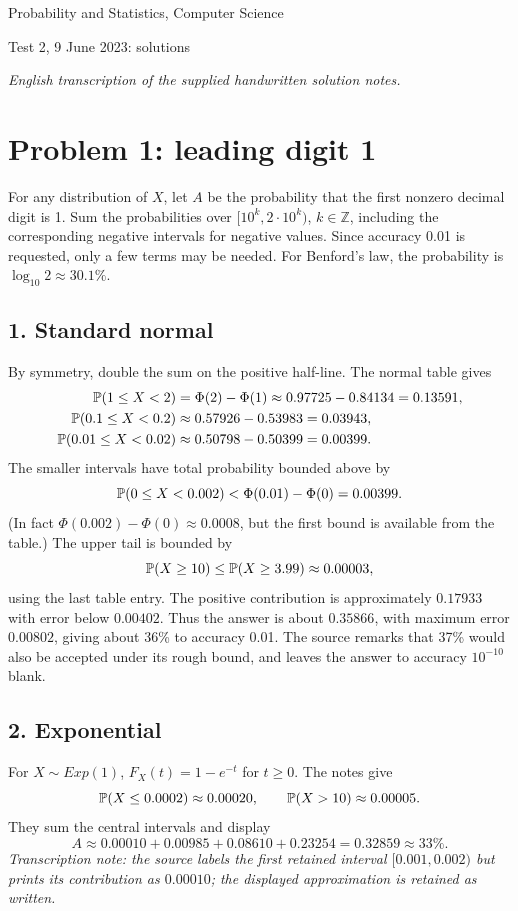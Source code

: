 \documentclass[a4paper]{article}
\begin{document}
\begin{center}\Large Probability and Statistics, Computer Science\par\large Test 2, 9 June 2023: solutions\end{center}
\noindent\textit{English transcription of the supplied handwritten solution notes.}
\section*{Problem 1: leading digit 1}
For any distribution of $X$, let $A$ be the probability that the first nonzero decimal digit is 1. Sum the probabilities over $[10^k,2\cdot10^k)$, $k\in\mathbb Z$, including the corresponding negative intervals for negative values. Since accuracy 0.01 is requested, only a few terms may be needed. For Benford's law, the probability is $\log_{10}2\approx30.1\%$.
\subsection*{1. Standard normal}
By symmetry, double the sum on the positive half-line. The normal table gives
\begin{align*}
\P(1\le X<2)&=\Phi(2)-\Phi(1)\approx0.97725-0.84134=0.13591,\\
\P(0.1\le X<0.2)&\approx0.57926-0.53983=0.03943,\\
\P(0.01\le X<0.02)&\approx0.50798-0.50399=0.00399.
\end{align*}
The smaller intervals have total probability bounded above by
\[\P(0\le X<0.002)<\Phi(0.01)-\Phi(0)=0.00399.\]
(In fact $\Phi(0.002)-\Phi(0)\approx0.0008$, but the first bound is available from the table.) The upper tail is bounded by
\[\P(X\ge10)\le\P(X\ge3.99)\approx0.00003,\]
using the last table entry. The positive contribution is approximately $0.17933$ with error below $0.00402$. Thus the answer is about $0.35866$, with maximum error $0.00802$, giving about 36\% to accuracy 0.01. The source remarks that 37\% would also be accepted under its rough bound, and leaves the answer to accuracy $10^{-10}$ blank.
\subsection*{2. Exponential}
For $X\sim Exp(1)$, $F_X(t)=1-e^{-t}$ for $t\ge0$. The notes give
\[\P(X\le0.0002)\approx0.00020,\qquad\P(X>10)\approx0.00005.\]
They sum the central intervals and display
\[A\approx0.00010+0.00985+0.08610+0.23254=0.32859\approx33\%.\]
\noindent\textit{Transcription note: the source labels the first retained interval $[0.001,0.002)$ but prints its contribution as $0.00010$; the displayed approximation is retained as written.}
\end{document}
